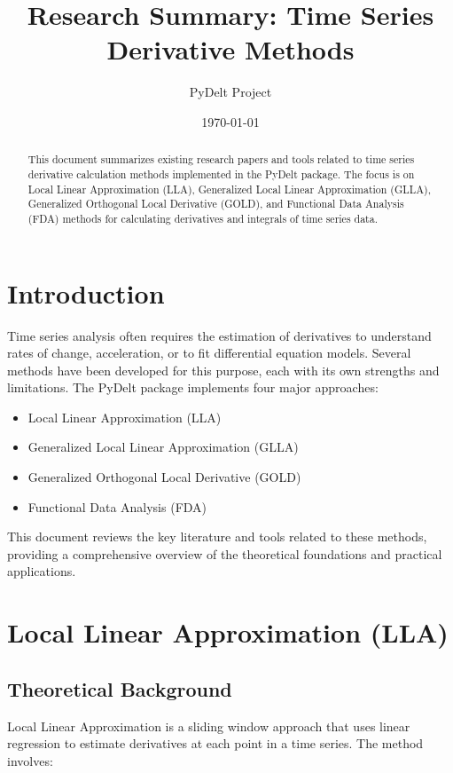 \documentclass{article}
\title{Research Summary: Time Series Derivative Methods}
\author{PyDelt Project}
\date{\today}
\begin{document}
\maketitle

\begin{abstract}
This document summarizes existing research papers and tools related to time series derivative calculation methods implemented in the PyDelt package. The focus is on Local Linear Approximation (LLA), Generalized Local Linear Approximation (GLLA), Generalized Orthogonal Local Derivative (GOLD), and Functional Data Analysis (FDA) methods for calculating derivatives and integrals of time series data.
\end{abstract}

\tableofcontents

\section{Introduction}

Time series analysis often requires the estimation of derivatives to understand rates of change, acceleration, or to fit differential equation models. Several methods have been developed for this purpose, each with its own strengths and limitations. The PyDelt package implements four major approaches:

\begin{itemize}
    \item Local Linear Approximation (LLA)
    \item Generalized Local Linear Approximation (GLLA)
    \item Generalized Orthogonal Local Derivative (GOLD)
    \item Functional Data Analysis (FDA)
\end{itemize}

This document reviews the key literature and tools related to these methods, providing a comprehensive overview of the theoretical foundations and practical applications.

\section{Local Linear Approximation (LLA)}

\subsection{Theoretical Background}

Local Linear Approximation is a sliding window approach that uses linear regression to estimate derivatives at each point in a time series. The method involves:
\end{document}
